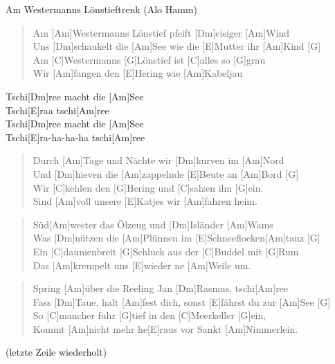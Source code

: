 \begin{song}{Am Westermanns Lönstief}{trenk (Alo Hamm)}

    \begin{verse}
        Am [Am]Westermanns Lönstief pfeift [Dm]eisiger [Am]Wind\\
        Uns [Dm]schaukelt die [Am]See wie die [E]Mutter ihr [Am]Kind [G]\\
        Am [C]Westermanns [G]Lönstief ist [C]alles so [G]grau \\
        Wir [Am]fangen den [E]Hering wie [Am]Kabeljau
    \end{verse}

    \begin{chorus}
        Tschi[Dm]ree macht die [Am]See \\
        Tschi[E]raa tschi[Am]ree \\
        Tschi[Dm]ree macht die [Am]See \\
        Tschi[E]ra-ha-ha-ha tschi[Am]ree 
    \end{chorus}


    \begin{verse}
        Durch [Am]Tage und Nächte wir [Dm]kurven im [Am]Nord \\
        Und [Dm]hieven die [Am]zappelnde [E]Beute an [Am]Bord [G] \\
        Wir [C]kehlen den [G]Hering und [C]salzen ihn [G]ein. \\
        Sind [Am]voll unsere [E]Katjes wir [Am]fahren heim.
    \end{verse}


    \begin{verse}
        Süd[Am]wester das Ölzeug und [Dm]Isländer [Am]Wams \\
        Was [Dm]nützen die [Am]Plünnen im [E]Schneeflocken[Am]tanz [G] \\
        Ein [C]daumenbreit [G]Schluck aus der [C]Buddel mit [G]Rum \\
        Das [Am]krempelt uns [E]wieder ne [Am]Weile um.
    \end{verse}


    \begin{verse}
    	Spring [Am]{ü}ber die Reeling Jan [Dm]Rasmus, tschi[Am]ree \\
        Fass [Dm]Taue, halt [Am]fest dich, sonst [E]fährst du zur [Am]See [G] \\
        So [C]mancher fuhr [G]tief in den [C]Meerkeller [G]ein, \\
        Kommt [Am]nicht mehr he[E]raus vor Sankt [Am]Nimmerlein.
    \end{verse}

     (letzte Zeile wiederholt)

\end{song}
